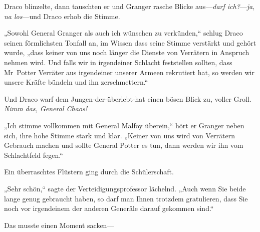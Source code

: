 Draco blinzelte, dann tauschten er und Granger rasche Blicke aus—\emph{darf ich?}—\emph{ja}, \emph{na los}—und Draco erhob die Stimme.

„Sowohl General Granger als auch ich wünschen zu verkünden,“ schlug Draco seinen förmlichsten Tonfall an, im Wissen dass seine Stimme verstärkt und gehört wurde, „dass keiner von uns noch länger die Dienste von Verrätern in Anspruch nehmen wird. Und falls wir in irgendeiner Schlacht feststellen sollten, dass Mr~Potter Verräter aus irgendeiner unserer Armeen rekrutiert hat, so werden wir unsere Kräfte bündeln und ihn zerschmettern.“

Und Draco warf dem Jungen-der-überlebt-hat einen bösen Blick zu, voller Groll. \emph{Nimm das, General Chaos!}

„Ich stimme vollkommen mit General Malfoy überein,“ hört er Granger neben sich, ihre hohe Stimme stark und klar. „Keiner von uns wird von Verrätern Gebrauch machen und sollte General Potter es tun, dann werden wir ihn vom Schlachtfeld fegen.“

Ein überraschtes Flüstern ging durch die Schülerschaft.

„Sehr schön,“ sagte der Verteidigungsprofessor lächelnd. „Auch wenn Sie beide lange genug gebraucht haben, so darf man Ihnen trotzdem gratulieren, dass Sie noch vor irgendeinem der anderen Generäle darauf gekommen sind.“

Das musste einen Moment sacken—

